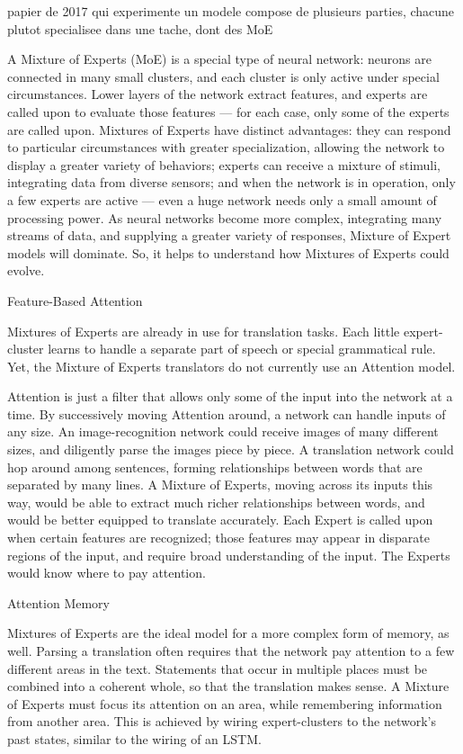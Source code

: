 papier de 2017 qui experimente un modele compose de plusieurs parties, chacune plutot specialisee
dans une tache, dont des MoE

A Mixture of Experts (MoE) is a special type of neural network: neurons are connected in many small clusters, and each cluster is only active under special circumstances. Lower layers of the network extract features, and experts are called upon to evaluate those features — for each case, only some of the experts are called upon. Mixtures of Experts have distinct advantages: they can respond to particular circumstances with greater specialization, allowing the network to display a greater variety of behaviors; experts can receive a mixture of stimuli, integrating data from diverse sensors; and when the network is in operation, only a few experts are active — even a huge network needs only a small amount of processing power. As neural networks become more complex, integrating many streams of data, and supplying a greater variety of responses, Mixture of Expert models will dominate. So, it helps to understand how Mixtures of Experts could evolve.

Feature-Based Attention

Mixtures of Experts are already in use for translation tasks. Each little expert-cluster learns to handle a separate part of speech or special grammatical rule. Yet, the Mixture of Experts translators do not currently use an Attention model.

Attention is just a filter that allows only some of the input into the network at a time. By successively moving Attention around, a network can handle inputs of any size. An image-recognition network could receive images of many different sizes, and diligently parse the images piece by piece. A translation network could hop around among sentences, forming relationships between words that are separated by many lines. A Mixture of Experts, moving across its inputs this way, would be able to extract much richer relationships between words, and would be better equipped to translate accurately. Each Expert is called upon when certain features are recognized; those features may appear in disparate regions of the input, and require broad understanding of the input. The Experts would know where to pay attention.

Attention Memory

Mixtures of Experts are the ideal model for a more complex form of memory, as well. Parsing a translation often requires that the network pay attention to a few different areas in the text. Statements that occur in multiple places must be combined into a coherent whole, so that the translation makes sense. A Mixture of Experts must focus its attention on an area, while remembering information from another area. This is achieved by wiring expert-clusters to the network’s past states, similar to the wiring of an LSTM.

